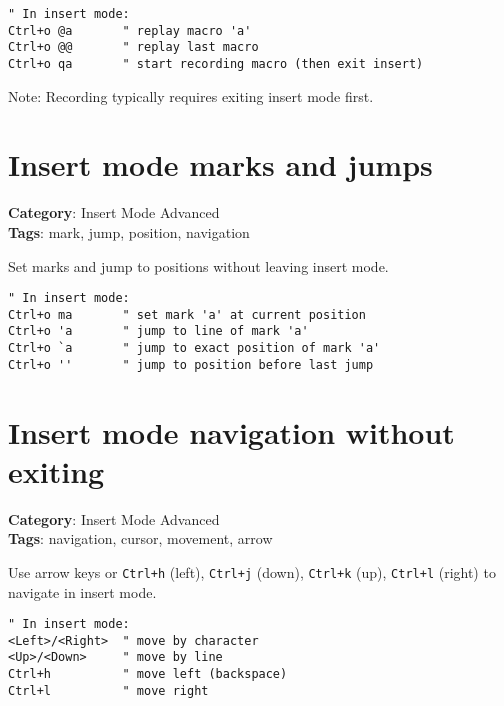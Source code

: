 {{{{{{\begin{Exa*}{}
\begin{Verbatim}[fontsize=\footnotesize, breaklines, breakanywhere]
" In insert mode:
Ctrl+o @a       " replay macro 'a'
Ctrl+o @@       " replay last macro
Ctrl+o qa       " start recording macro (then exit insert)
\end{Verbatim}
\end{Exa*}

Note: Recording typically requires exiting insert mode first.

\section{Insert mode marks and jumps}

\textbf{Category}: Insert Mode Advanced\\ \textbf{Tags}: mark, jump, position, navigation
\vspace{0.5cm}

Set marks and jump to positions without leaving insert mode.

\begin{Exa*}{}
\begin{Verbatim}[fontsize=\footnotesize, breaklines, breakanywhere]
" In insert mode:
Ctrl+o ma       " set mark 'a' at current position
Ctrl+o 'a       " jump to line of mark 'a'
Ctrl+o `a       " jump to exact position of mark 'a'
Ctrl+o ''       " jump to position before last jump
\end{Verbatim}
\end{Exa*}

\section{Insert mode navigation without exiting}

\textbf{Category}: Insert Mode Advanced\\ \textbf{Tags}: navigation, cursor, movement, arrow
\vspace{0.5cm}

Use arrow keys or {\footnotesize \Verb§Ctrl+h§} (left), {\footnotesize \Verb§Ctrl+j§} (down), {\footnotesize \Verb§Ctrl+k§} (up), {\footnotesize \Verb§Ctrl+l§} (right) to navigate in insert mode.

\begin{Exa*}{}
\begin{Verbatim}[fontsize=\footnotesize, breaklines, breakanywhere]
" In insert mode:
<Left>/<Right>  " move by character
<Up>/<Down>     " move by line
Ctrl+h          " move left (backspace)
Ctrl+l          " move right
\end{Verbatim}
\end{Exa*}

}}}}}}
